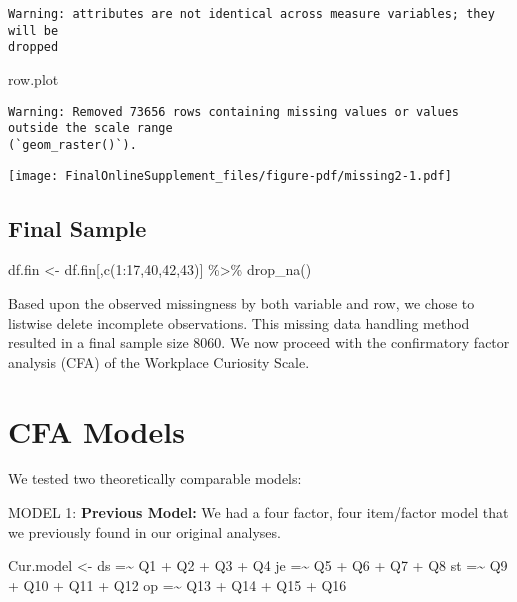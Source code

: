 \documentclass[
  letterpaper,
  DIV=11,
  numbers=noendperiod]{scrartcl}
\newenvironment{Shaded}{\begin{snugshade}}{\end{snugshade}}
\newcommand{\DecValTok}[1]{\textcolor[rgb]{0.68,0.00,0.00}{#1}}
\newcommand{\FunctionTok}[1]{\textcolor[rgb]{0.28,0.35,0.67}{#1}}
\newcommand{\NormalTok}[1]{\textcolor[rgb]{0.00,0.23,0.31}{#1}}
\newcommand{\OtherTok}[1]{\textcolor[rgb]{0.00,0.23,0.31}{#1}}
\newcommand{\SpecialCharTok}[1]{\textcolor[rgb]{0.37,0.37,0.37}{#1}}
\newcommand{\StringTok}[1]{\textcolor[rgb]{0.13,0.47,0.30}{#1}}
\begin{document}
\begin{verbatim}
Warning: attributes are not identical across measure variables; they will be
dropped
\end{verbatim}

\begin{Shaded}
\begin{Highlighting}[]
\NormalTok{row.plot}
\end{Highlighting}
\end{Shaded}

\begin{verbatim}
Warning: Removed 73656 rows containing missing values or values outside the scale range
(`geom_raster()`).
\end{verbatim}

\texttt{[image: FinalOnlineSupplement\_files/figure-pdf/missing2-1.pdf]}

\subsection{Final Sample}\label{final-sample}

\begin{Shaded}
\begin{Highlighting}[]
\NormalTok{df.fin }\OtherTok{\textless{}{-}}\NormalTok{ df.fin[,}\FunctionTok{c}\NormalTok{(}\DecValTok{1}\SpecialCharTok{:}\DecValTok{17}\NormalTok{,}\DecValTok{40}\NormalTok{,}\DecValTok{42}\NormalTok{,}\DecValTok{43}\NormalTok{)] }\SpecialCharTok{\%\textgreater{}\%} \FunctionTok{drop\_na}\NormalTok{()}
\end{Highlighting}
\end{Shaded}

Based upon the observed missingness by both variable and row, we chose
to listwise delete incomplete observations. This missing data handling
method resulted in a final sample size 8060. We now proceed with the
confirmatory factor analysis (CFA) of the Workplace Curiosity Scale.

\section{CFA Models}\label{cfa-models}

We tested two theoretically comparable models:

MODEL 1: \textbf{Previous Model:} We had a four factor, four item/factor
model that we previously found in our original analyses.

\begin{Shaded}
\begin{Highlighting}[]
\NormalTok{Cur.model }\OtherTok{\textless{}{-}} \StringTok{\textquotesingle{}ds =\textasciitilde{} Q1 + Q2 + Q3 + Q4}
\StringTok{              je =\textasciitilde{} Q5 + Q6 + Q7 + Q8}
\StringTok{              st =\textasciitilde{} Q9 + Q10 + Q11 + Q12}
\StringTok{              op =\textasciitilde{} Q13 + Q14 + Q15 + Q16\textquotesingle{}}
\end{Highlighting}
\end{Shaded}
\end{document}
